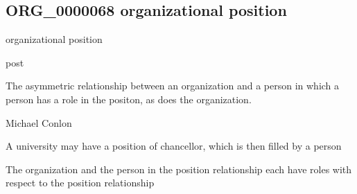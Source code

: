 \documentclass[letterpaper,10pt,english]{sphinxmanual}
\begin{document}
\subsection{ORG\_0000068 \sphinxhyphen{} organizational position}
\label{\detokenize{doc-ORG_0000068:org-0000068-organizational-position}}\label{\detokenize{doc-ORG_0000068:index-0}}\label{\detokenize{doc-ORG_0000068::doc}}
\begin{sphinxShadowBox}

\sphinxAtStartPar
organizational position
\end{sphinxShadowBox}

\begin{sphinxShadowBox}

\sphinxAtStartPar
post
\end{sphinxShadowBox}

\begin{sphinxShadowBox}

\sphinxAtStartPar
The asymmetric relationship between an organization and a person in which a person has a role in the positon, as does the organization.
\end{sphinxShadowBox}

\begin{sphinxShadowBox}

\sphinxAtStartPar
Michael Conlon 
\end{sphinxShadowBox}

\begin{sphinxShadowBox}

\sphinxAtStartPar
A university may have a position of chancellor, which is then filled by a person
\end{sphinxShadowBox}

\begin{sphinxShadowBox}

\sphinxAtStartPar
The organization and the person in the position relationship each have roles with respect to the position relationship
\end{sphinxShadowBox}

\begin{sphinxShadowBox}

\sphinxAtStartPar
{}
\end{sphinxShadowBox}
\end{document}
